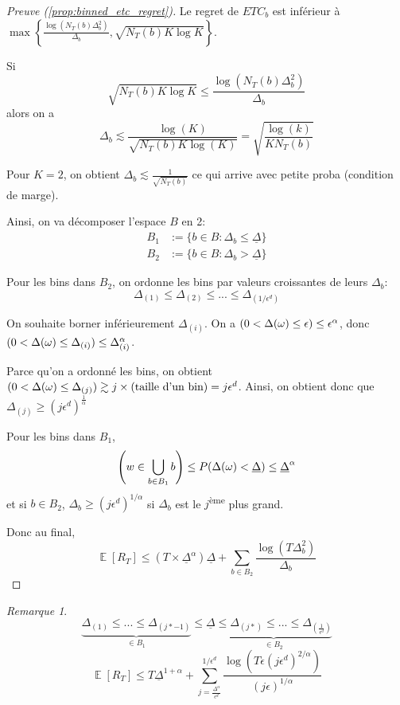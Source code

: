 \documentclass{article}
\DeclareMathOperator*{\E}{\mathbb{E}}
\let\P\relax
\DeclareMathOperator*{\P}{\mathbb{P}}
\theoremstyle{remark}
\theoremstyle{remark}
\newtheorem{remark}{Remarque}[section]
\begin{document}
\begin{proof}[Preuve (\autoref{prop:binned_etc_regret})]
   Le regret de $ETC_b$ est inférieur à $\max\left\{ \frac{\log(N_T(b) \Delta_b^2)}{\Delta_b} , \sqrt{N_T(b) K \log K} \right\}$.

   Si
   $$
   \sqrt{N_T(b) K \log K} \leq \frac{\log(N_T(b) \Delta_b^2)}{\Delta_b}
   $$
   alors on a
   $$
   \Delta_b \lesssim \frac{\log(K)}{\sqrt{N_T(b) K \log(K)}} = \sqrt{\frac{\log(k)}{K N_T(b)}}
   $$

   Pour $K=2$, on obtient $\Delta_b \lesssim \frac{1}{\sqrt{N_T(b)}}$ ce qui arrive avec petite proba (condition de marge).

   Ainsi, on va décomposer l'espace $B$ en 2:
   \begin{align*}
      B_1 &:= \{ b \in B : \Delta_b \leq \underline{\Delta} \} \\
      B_2 &:= \{ b \in B : \Delta_b > \underline{\Delta} \}
   \end{align*}

   Pour les bins dans $B_2$, on ordonne les bins par valeurs croissantes de leurs $\Delta_b$:
   $$
   \Delta_{(1)} \leq \Delta_{(2)} \leq ... \leq \Delta_{(1/\epsilon^d)}
   $$

   On souhaite borner inférieurement $\Delta_{(i)}$. On a $\P(0 < \Delta(\omega) \leq \epsilon) \leq \epsilon^\alpha$, donc $\P(0 < \Delta(\omega) \leq \Delta_{(i)}) \leq \Delta_{(i)}^\alpha$.

   Parce qu'on a ordonné les bins, on obtient $\P(0 < \Delta(\omega) \leq \Delta_{(j)}) \gtrsim j \times (\text{taille d'un bin}) = j \epsilon^d$. Ainsi, on obtient donc que $\Delta_{(j)} \geq (j \epsilon^d)^\frac{1}{\alpha}$

   Pour les bins dans $B_1$,
   $$
   \P\left(w \in \bigcup_{b \in B_1} b\right) \leq P(\Delta(\omega) < \underline{\Delta}) \leq \underline{\Delta}^\alpha
   $$
   et si $b \in B_2$, $ \Delta_b \geq (j \epsilon^d)^{1/\alpha}$ si $\Delta_b$ est le $j$\textsuperscript{ème} plus grand.

   Donc au final,
   $$
   \E[R_T] \leq (T \times \underline{\Delta}^\alpha) \underline{\Delta} + \sum_{b \in B_2} \frac{\log(T \Delta_b^2)}{\Delta_b}
   $$
\end{proof}

\begin{remark}
   $$
   \underbrace{\Delta_{(1)} \leq  ... \leq \Delta_{(j*-1)}}_{\in B_1} \leq \underline{\Delta} \underbrace{\leq \Delta_{(j*)} \leq ... \leq \Delta_{(\frac{1}{\epsilon^d})}}_{\in B_2}
   $$
   $$
   \E[R_T] \leq T \underline{\Delta}^{1+\alpha} + \sum_{j= \frac{\underline{\Delta}^\alpha}{\epsilon^d}}^{1/\epsilon^d} \frac{\log(T \epsilon (j \epsilon^d)^{2/\alpha})}{(j \epsilon)^{1/\alpha}}
   $$
\end{remark}
\end{document}
